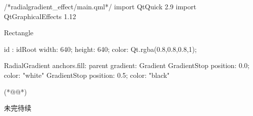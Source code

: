 \label{f000062}    %
\FloatBarrier                                  %
\begin{thebookfilesourceone}[escapeinside={(*@}{@*)},
caption=GoodLuck,
title=\filesourcenumbernameone \thefilesourcenumber
]
/*radialgradient_effect/main.qml*/
import QtQuick 2.9
import QtGraphicalEffects 1.12

Rectangle {
    id : idRoot
    width: 640;
    height: 640;
    color: Qt.rgba(0.8,0.8,0.8,1);

    RadialGradient {
        anchors.fill: parent
        gradient: Gradient {
            GradientStop { position: 0.0; color: "white" }
            GradientStop { position: 0.5; color: "black" }
        }
    }

}(*@\marginpar[\hfill\setlength\fboxsep{2pt}\fbox{\footnotesize{\kaishu\parbox{1em}{\setlength{\baselineskip}{2pt}\filesourcenumbernameone}}\footnotesize{\thefilesourcenumber}}]{\setlength\fboxsep{2pt}\fbox{\footnotesize{\kaishu\parbox{1em}{\setlength{\baselineskip}{2pt}\filesourcenumbernameone}}\footnotesize{\thefilesourcenumber}}}@*)\end{thebookfilesourceone}          %
\addtocounter{lstlisting}{-1}   %


未完待续









